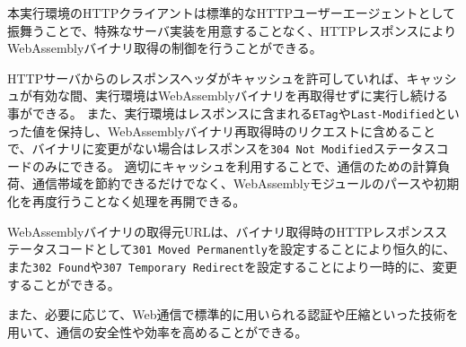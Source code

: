 本実行環境のHTTPクライアントは標準的なHTTPユーザーエージェントとして振舞うことで、特殊なサーバ実装を用意することなく、HTTPレスポンスによりWebAssemblyバイナリ取得の制御を行うことができる。

HTTPサーバからのレスポンスヘッダがキャッシュを許可していれば、キャッシュが有効な間、実行環境はWebAssemblyバイナリを再取得せずに実行し続ける事ができる。
また、実行環境はレスポンスに含まれる{\tt ETag}や{\tt Last-Modified}といった値を保持し、WebAssemblyバイナリ再取得時のリクエストに含めることで、バイナリに変更がない場合はレスポンスを{\tt 304 Not Modified}ステータスコードのみにできる。
適切にキャッシュを利用することで、通信のための計算負荷、通信帯域を節約できるだけでなく、WebAssemblyモジュールのパースや初期化を再度行うことなく処理を再開できる。

WebAssemblyバイナリの取得元URLは、バイナリ取得時のHTTPレスポンスステータスコードとして{\tt 301 Moved Permanently}を設定することにより恒久的に、また{\tt 302 Found}や{\tt 307 Temporary Redirect}を設定することにより一時的に、変更することができる。

また、必要に応じて、Web通信で標準的に用いられる認証や圧縮といった技術を用いて、通信の安全性や効率を高めることができる。
